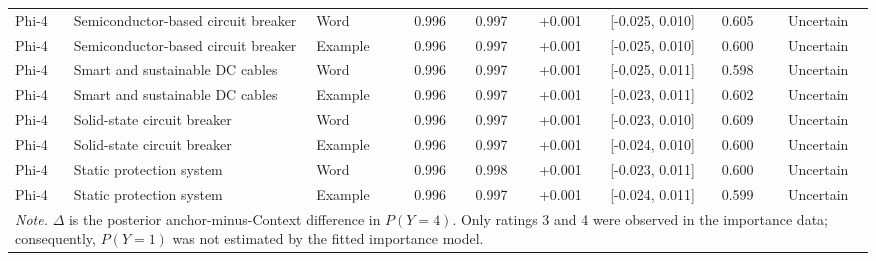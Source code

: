 \begin{landscape}
\begin{longtable}{lllcccccc}
Phi-4 & Semiconductor-based circuit breaker & Word & 0.996 & 0.997 & +0.001 & [-0.025, 0.010] & 0.605 & Uncertain \\
Phi-4 & Semiconductor-based circuit breaker & Example & 0.996 & 0.997 & +0.001 & [-0.025, 0.010] & 0.600 & Uncertain \\
Phi-4 & Smart and sustainable DC cables & Word & 0.996 & 0.997 & +0.001 & [-0.025, 0.011] & 0.598 & Uncertain \\
Phi-4 & Smart and sustainable DC cables & Example & 0.996 & 0.997 & +0.001 & [-0.023, 0.011] & 0.602 & Uncertain \\
Phi-4 & Solid-state circuit breaker & Word & 0.996 & 0.997 & +0.001 & [-0.023, 0.010] & 0.609 & Uncertain \\
Phi-4 & Solid-state circuit breaker & Example & 0.996 & 0.997 & +0.001 & [-0.024, 0.010] & 0.600 & Uncertain \\
Phi-4 & Static protection system & Word & 0.996 & 0.998 & +0.001 & [-0.023, 0.011] & 0.600 & Uncertain \\
Phi-4 & Static protection system & Example & 0.996 & 0.997 & +0.001 & [-0.024, 0.011] & 0.599 & Uncertain \\
\midrule
\multicolumn{9}{p{0.96\linewidth}}{\footnotesize\textit{Note.} $\Delta$ is the posterior anchor-minus-Context difference in $P(Y=4)$. Only ratings 3 and 4 were observed in the importance data; consequently, $P(Y=1)$ was not estimated by the fitted importance model.}\\
\end{longtable}
\end{landscape}
